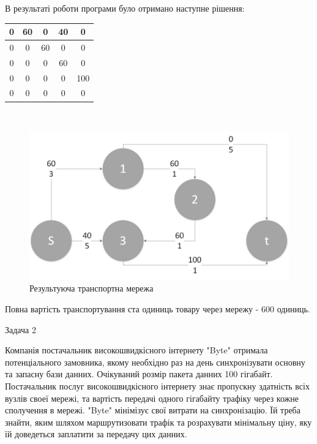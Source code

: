 \documentclass[a4paper,14pt,russian,ukrainian,oneside,final]{extreport}
\begin{document}
\indent В результаті роботи програми було отримано наступне рішення:
\begin{center}
\begin{tabular}{|c|c|c|c|c|}
\hline
0&60&0&40&0 \\
\hline
0&0&60&0&0 \\
\hline
0&0&0&60&0 \\
\hline
0&0&0&0&100\\
\hline
0&0&0&0&0 \\
\hline
\end{tabular} \\
\begin{figure}[h]

\includegraphics[scale=0.65]{G1_1.jpg}
\caption{Результуюча транспортна мережа}

\end{figure}
Повна вартість транспортування ста одиниць товару через мережу - 600 одиниць.
\end{center}



Задача 2

\indent
Компанія постачальник високошвидкісного інтернету "Byte" отримала потенціального замовника, якому необхідно раз на день синхронізувати основну та запасну бази данних. Очікуваний розмір пакета данних 100 гігабайт. Постачальник послуг високошвидкісного інтернету знає пропускну здатність всіх вузлів своеї мережі, та вартість передачі одного гігабайту трафіку через кожне сполучення в мережі. "Byte" мінімізує свої витрати на синхронізацію. Їй треба знайти, яким шляхом маршрутизовати трафік та розрахувати мінімальну ціну, яку їй доведеться заплатити за передачу цих данних.
\end{document}
